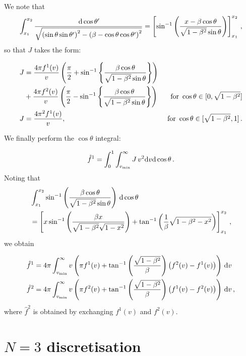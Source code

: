 We note that
\begin{equation}
\int_{x_1}^{x_2} \frac{\, \mathrm{d}\cos\theta'}{\sqrt{\left(\sin\theta\sin\theta'\right)^2 - \left(\beta - \cos\theta\cos\theta'\right)^2}} = \left[\sin^{-1}\left(\frac{x-\beta\cos\theta}{\sqrt{1-\beta^2}\sin\theta}\right)\right]_{x_1}^{x_2}\,,
\end{equation}
so that $J$ takes the form:

\begin{align}
J &= \frac{4\pi f^1(v)}{v}\left(\frac{\pi}{2} + \sin^{-1}\left\{\frac{\beta\cos\theta}{\sqrt{1-\beta^2}\sin\theta}\right\}\right) \nonumber \\
& + \frac{4\pi f^2(v)}{v}\left(\frac{\pi}{2} - \sin^{-1}\left\{\frac{\beta\cos\theta}{\sqrt{1-\beta^2}\sin\theta}\right\}\right) & \textrm{ for } \cos\theta \in [0,\sqrt{1-\beta^2}] \nonumber \\
J &= \frac{4\pi^2 f^1(v)}{v}, & \textrm{ for } \cos\theta \in [\sqrt{1-\beta^2},1]\,.
\end{align}

We finally perform the $\cos\theta$ integral:

\begin{equation}
\hat{f}^1 = \int_{0}^{1} \int_{\vmin}^{\infty}  J \, v^2 \mathrm{d}v \mathrm{d}\cos\theta\,.
\end{equation}
Noting that
\begin{align}
\label{eq:RadonCalc:K0}
&\int_{x_1}^{x_2} \sin^{-1}\left(\frac{\beta\cos\theta}{\sqrt{1-\beta^2}\sin\theta}\right) \,\mathrm{d}\cos\theta \notag\\
& =\left[ x \sin^{-1}\left(\frac{\beta x}{\sqrt{1-\beta^2}\sqrt{1-x^2}}\right) + \tan^{-1}\left(\frac{1}{\beta}\sqrt{1-\beta^2 -x^2}\right)\right]_{x_1}^{x_2}\,,
\end{align}
we obtain

\begin{align}
\label{eq:RadonCalc:N2result}
\hat{f}^1 &= 4\pi\int_{\vmin}^{\infty} v \left( \pi f^1(v) + \atan\left(\frac{\sqrt{1-\beta^2}}{\beta}\right)\left(f^2(v) - f^1(v)\right) \right) \, \mathrm{d}v \\
\hat{f}^2 &= 4\pi\int_{\vmin}^{\infty} v \left( \pi f^2(v) + \atan\left(\frac{\sqrt{1-\beta^2}}{\beta}\right)\left(f^1(v) - f^2(v)\right) \right) \, \mathrm{d}v\,,
\end{align}
where $\hat{f}^2$ is obtained by exchanging $f^1(v)$ and $f^2(v)$.

\section{$N=3$ discretisation}

